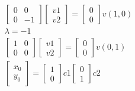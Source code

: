 \documentclass[a4paper,10pt]{article}
\begin{document}
\begin{enumerate}
\begin{enumerate}
\begin{equation}
\begin{aligned}
\begin{bmatrix}
                            0 & 0\\
                            0 &-1 
                        \end{bmatrix}
                        \begin{bmatrix}
                            v1\\
                            v2
                        \end{bmatrix}
                        = 
                        \begin{bmatrix}
                            0\\
                            0
                        \end{bmatrix}
                        v(1,0)\\
                        \lambda= -1\\
                        \begin{bmatrix}
                            1 & 0\\
                            0 &0 
                        \end{bmatrix}
                        \begin{bmatrix}
                            v1\\
                            v2
                        \end{bmatrix}
                        = 
                        \begin{bmatrix}
                            0\\
                            0
                        \end{bmatrix}
                        v(0,1)\\
                        \begin{bmatrix}
                            x_{0}\\
                            y_{0}
                        \end{bmatrix}
                        =
                        \begin{bmatrix}
                            1\\
                            0
                        \end{bmatrix}c1
                        \begin{bmatrix}
                            0\\
                            1
                        \end{bmatrix}c2\\

\end{aligned}
\end{equation}
\end{enumerate}
\end{enumerate}
\end{document}
